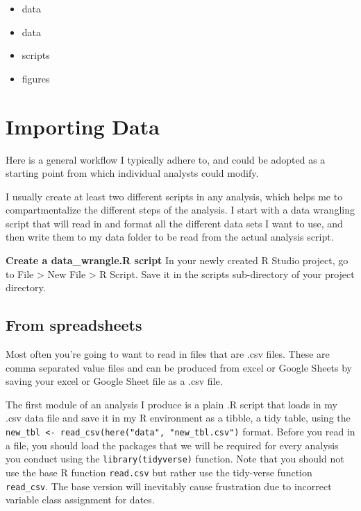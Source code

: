 \documentclass[]{book}
\providecommand{\tightlist}{%
  \setlength{\itemsep}{0pt}\setlength{\parskip}{0pt}}
\begin{document}
\begin{itemize}
\tightlist
\item
  data
\item
  data
\item
  scripts
\item
  figures
\end{itemize}

\section{Importing Data}\label{importing-data}

Here is a general workflow I typically adhere to, and could be adopted
as a starting point from which individual analysts could modify.

I usually create at least two different scripts in any analysis, which
helps me to compartmentalize the different steps of the analysis. I
start with a data wrangling script that will read in and format all the
different data sets I want to use, and then write them to my data folder
to be read from the actual analysis script.

\textbf{Create a data\_wrangle.R script} In your newly created R Studio
project, go to File \textgreater{} New File \textgreater{} R Script.
Save it in the scripts sub-directory of your project directory.

\subsection{From spreadsheets}\label{from-spreadsheets}

Most often you're going to want to read in files that are .csv files.
These are comma separated value files and can be produced from excel or
Google Sheets by saving your excel or Google Sheet file as a .csv file.

The first module of an analysis I produce is a plain .R script that
loads in my .csv data file and save it in my R environment as a tibble,
a tidy table, using the
\texttt{new\_tbl\ \textless{}-\ read\_csv(here("data",\ "new\_tbl.csv")}
format. Before you read in a file, you should load the packages that we
will be required for every analysis you conduct using the
\texttt{library(tidyverse)} function. Note that you should not use the
base R function \texttt{read.csv} but rather use the tidy-verse function
\texttt{read\_csv}. The base version will inevitably cause frustration
due to incorrect variable class assignment for dates.
\end{document}

